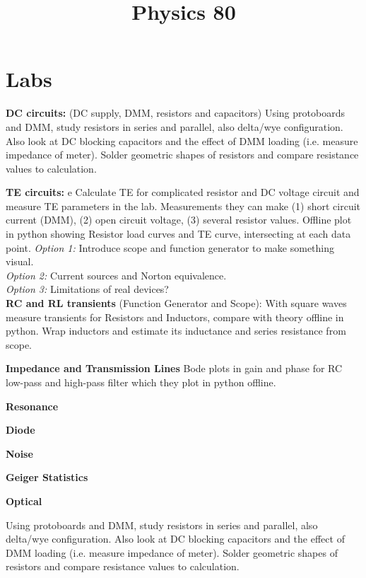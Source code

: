 \documentclass[12pt]{article}
\begin{document}



\title{Physics 80}

\maketitle

\section{Labs}

\noindent
{\bf  DC circuits:} (DC supply, DMM, resistors and capacitors)
Using protoboards and DMM, study resistors in series and parallel, also delta/wye configuration.  Also look at DC blocking capacitors and the effect of DMM loading (i.e. measure impedance of meter).  Solder geometric shapes of resistors and compare resistance values to calculation.

{\bf  TE circuits:} e
Calculate TE for complicated resistor and DC voltage circuit and measure TE parameters in the lab.
Measurements they can make (1) short circuit current (DMM), (2) open circuit voltage, (3) several resistor values.  Offline plot in python showing Resistor load curves and TE curve, intersecting at each data point.
{\em Option 1:}  Introduce scope and function generator to make something visual. \\
{\em Option 2:}  Current sources and Norton equivalence. \\
{\em Option 3:}  Limitations of real devices? \\

{\bf  RC and RL transients} (Function Generator and Scope):
With square waves measure transients for Resistors and Inductors, compare with theory offline in python.
Wrap inductors and estimate its inductance and series resistance from scope.

{\bf  Impedance and Transmission Lines} 
Bode plots in gain and phase for RC low-pass and high-pass filter which they plot in python offline.

{\bf  Resonance} 

{\bf  Diode} 

{\bf  Noise} 

{\bf  Geiger Statistics} 

{\bf  Optical} 





 







Using protoboards and DMM, study resistors in series and parallel, also delta/wye configuration.  Also look at DC blocking capacitors and the effect of DMM loading (i.e. measure impedance of meter).  Solder geometric shapes of resistors and compare resistance values to calculation.
\end{document}
